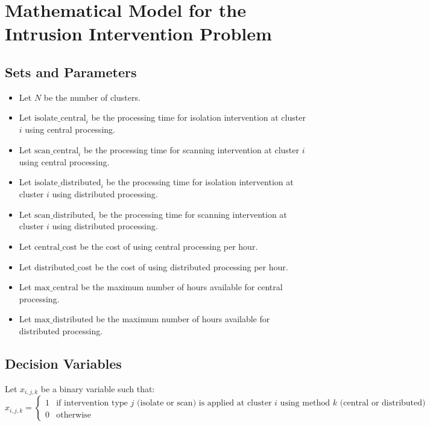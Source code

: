\documentclass{article}
\begin{document}
\section*{Mathematical Model for the Intrusion Intervention Problem}

\subsection*{Sets and Parameters}
\begin{itemize}
    \item Let \( N \) be the number of clusters.
    \item Let \( \text{isolate\_central}_i \) be the processing time for isolation intervention at cluster \( i \) using central processing.
    \item Let \( \text{scan\_central}_i \) be the processing time for scanning intervention at cluster \( i \) using central processing.
    \item Let \( \text{isolate\_distributed}_i \) be the processing time for isolation intervention at cluster \( i \) using distributed processing.
    \item Let \( \text{scan\_distributed}_i \) be the processing time for scanning intervention at cluster \( i \) using distributed processing.
    \item Let \( \text{central\_cost} \) be the cost of using central processing per hour.
    \item Let \( \text{distributed\_cost} \) be the cost of using distributed processing per hour.
    \item Let \( \text{max\_central} \) be the maximum number of hours available for central processing.
    \item Let \( \text{max\_distributed} \) be the maximum number of hours available for distributed processing.
\end{itemize}

\subsection*{Decision Variables}
Let \( x_{i,j,k} \) be a binary variable such that:
\[
x_{i,j,k} = 
\begin{cases} 
1 & \text{if intervention type } j \text{ (isolate or scan) is applied at cluster } i \text{ using method } k \text{ (central or distributed)} \\
0 & \text{otherwise}
\end{cases}
\]
\end{document}
